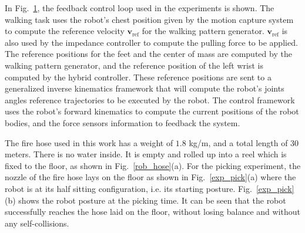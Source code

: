 %
\begin{figure}
  \centering
  
 \vspace{-3mm}
 \label{feed_back_graph}
\end{figure}
%



In Fig.~\ref{feed_back_graph}, the feedback control loop used in the experiments is shown.
%
The walking task uses the robot's chest position given by the motion capture system to compute the reference velocity $\mathbf{v}_{\text{ref}}$ for the walking pattern generator.
%
$\mathbf{v}_{\text{ref}}$ is also used by the impedance controller to compute the pulling force to be applied.
%
The reference positions for the feet and the center of mass are computed by the walking pattern generator, and the reference position of the left wrist is computed by the hybrid controller.
%
These reference positions are sent to a generalized inverse kinematics framework \cite{mansard:icar:09} that will compute the robot's joints angles reference trajectories to be executed by the robot.
%
The control framework uses the robot's forward kinematics to compute the current positions of the robot bodies, and the force sensors information to feedback the system.



The fire hose used in this work has a weight of $1.8$ kg/m, and a total length of $30$ meters.
%
There is no water inside.
%
It is empty and rolled up into a reel which is fixed to the floor, as shown in Fig.~\ref{rob_hose}(a).
%
For the picking experiment, the nozzle of the fire hose lays on the floor as shown in Fig.~\ref{exp_pick}(a) where the robot is at its half sitting configuration, i.e. its starting posture.
%
Fig.~\ref{exp_pick}(b) shows the robot posture at the picking time.
%
It can be seen that the robot successfully reaches the hose laid on the floor, without losing balance and without any self-collisions.



